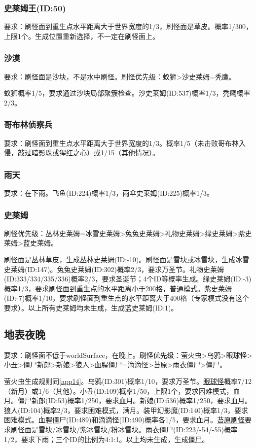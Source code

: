 \subsubsection{史莱姆王(ID:50)}
要求：刷怪面到重生点水平距离大于世界宽度的1/3，刷怪面是草皮。概率1/300，上限1个。生成位置重新选择，不一定在刷怪面上。

\subsubsection{沙漠}
要求：刷怪面是沙块，不是水中刷怪。刷怪优先级：蚁狮>沙史莱姆=秃鹰。

蚁狮概率1/5，要求通过沙块局部聚簇检查。沙史莱姆(ID:537)概率1/3，秃鹰概率2/3。

\subsubsection{哥布林侦察兵}
要求：刷怪面到重生点水平距离大于世界宽度的1/3。概率1/5（未击败哥布林入侵，敲过暗影珠或猩红之心）或1/15（其他情况）。

\subsubsection{雨天}
要求：在下雨。飞鱼(ID:224)概率1/3，雨伞史莱姆(ID:225)概率1/3。

\subsubsection{史莱姆}
刷怪优先级：丛林史莱姆=冰雪史莱姆>兔兔史莱姆>礼物史莱姆>绿史莱姆>紫史莱姆>蓝史莱姆。

刷怪面是丛林草皮，生成丛林史莱姆(ID:-10)。刷怪面是雪块或冰雪块，生成冰雪史莱姆(ID:147)。兔兔史莱姆(ID:302)概率2/3，要求万圣节。礼物史莱姆(ID:333/334/335/336)概率2/3，要求圣诞节；4个ID等概率生成。绿史莱姆(ID:-3)概率1/3，要求刷怪面到重生点的水平距离小于200格，普通模式。紫史莱姆(ID:-7)概率1/10，要求刷怪面到重生点的水平距离大于400格（专家模式没有这个要求）。以上所有史莱姆均未生成，生成蓝史莱姆(ID:1)。

\subsection{地表夜晚}
要求：刷怪面不低于worldSurface，在晚上。刷怪优先级：萤火虫>乌鸦>眼球怪>小丑>僵尸新郎>新娘>狼人>血腥僵尸=滴滴怪>苔原>雨衣僵尸>僵尸。

萤火虫生成规则同\autoref{app14}。乌鸦(ID:301)概率1/10，要求万圣节。\hyperref[app15]{眼球怪}概率7/12（新月）或1/6（其他）。小丑(ID:109)概率1/50，上限1个，要求困难模式，血月。僵尸新郎(ID:53)概率1/250，要求血月。新娘(ID:536)概率1/250，要求血月。狼人(ID:104)概率2/3，要求困难模式，满月。装甲幻影魔(ID:140)概率1/3，要求困难模式。血腥僵尸(ID:489)和滴滴怪(ID:490)概率各1/5，要求血月。\hyperref[app16]{苔原刷怪}要求刷怪面是雪块/冰雪块/紫冰雪块/粉冰雪块。雨衣僵尸(ID:223/-54/-55)概率1/2，要求下雨；三个ID的比例为4:1:1。以上均未生成，生成\hyperref[app17]{僵尸}。

